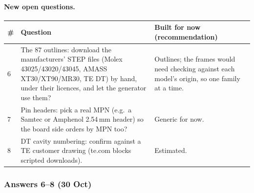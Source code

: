 \paragraph{New open questions.}
\begin{center}
\small
\begin{tabularx}{\linewidth}{@{}lXX@{}}
\toprule
\# & Question & Built for now (recommendation)\\
\midrule
6 & The 87 outlines: download the manufacturers' STEP files (Molex 43025/43020/43045, AMASS XT30/XT90/MR30, TE
  DT) by hand, under their licences, and let the generator use them? & Outlines; the frames would need checking
  against each model's origin, so one family at a time.\\
7 & Pin headers: pick a real MPN (e.g.\ a Samtec or Amphenol 2.54\,mm header) so the board side orders by MPN too?
  & Generic for now.\\
8 & DT cavity numbering: confirm against a TE customer drawing (te.com blocks scripted downloads). & Estimated.\\
\bottomrule
\end{tabularx}
\end{center}

\subsubsection*{Answers 6--8 (30 Oct)}

